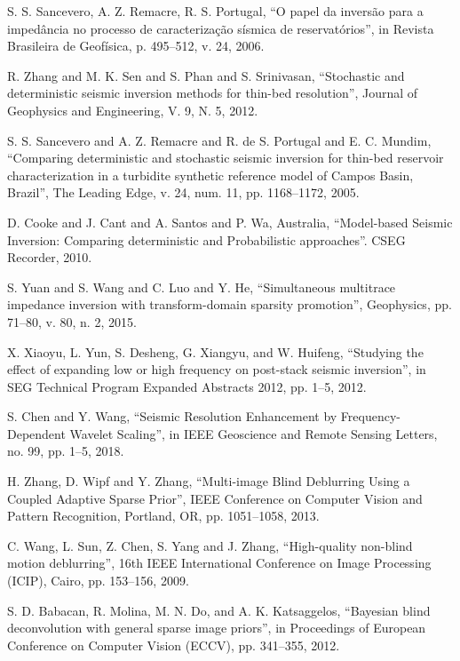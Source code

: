 \documentclass[journal]{IEEEtran}
\begin{document}
\begin{thebibliography}{1}
S. S. Sancevero, A. Z. Remacre, R. S. Portugal, ``O papel da inversão para a impedância no processo de caracterização sísmica de reservatórios'', in Revista Brasileira de Geofísica, p. 495--512, v. 24, 2006.

R. Zhang and M. K. Sen and S. Phan and S. Srinivasan, ``Stochastic and deterministic seismic inversion methods for thin-bed resolution'', Journal of Geophysics and Engineering, V. 9, N. 5, 2012.

S. S. Sancevero and A. Z. Remacre and R. de S. Portugal and E. C. Mundim, ``Comparing deterministic and stochastic seismic inversion for thin-bed reservoir characterization in a turbidite synthetic reference model of Campos Basin, Brazil'', The Leading Edge, v. 24, num. 11, pp. 1168--1172, 2005. 

D. Cooke and J. Cant and A. Santos and  P. Wa, Australia,  ``Model-based Seismic Inversion: Comparing deterministic and Probabilistic approaches''. CSEG Recorder, 2010. 

S. Yuan and S. Wang and C. Luo and Y. He, ``Simultaneous multitrace impedance inversion with transform-domain sparsity promotion'', Geophysics, pp. 71--80, v. 80, n. 2, 2015.

X. Xiaoyu, L. Yun, S. Desheng, G. Xiangyu, and W. Huifeng, ``Studying the effect of expanding low or high frequency on post-stack seismic inversion'', in SEG Technical Program Expanded Abstracts 2012, pp. 1--5, 2012.

S. Chen and Y. Wang, ``Seismic Resolution Enhancement by Frequency-Dependent Wavelet Scaling'', in IEEE Geoscience and Remote Sensing Letters, no. 99, pp. 1--5, 2018.

H. Zhang, D. Wipf and Y. Zhang, ``Multi-image Blind Deblurring Using a Coupled Adaptive Sparse Prior'', IEEE Conference on Computer Vision and Pattern Recognition, Portland, OR, pp. 1051--1058, 2013.

C. Wang, L. Sun, Z. Chen, S. Yang and J. Zhang, ``High-quality non-blind motion deblurring'', 16th IEEE International Conference on Image Processing (ICIP), Cairo, pp. 153--156, 2009.

S. D. Babacan, R. Molina, M. N. Do, and A. K. Katsaggelos, ``Bayesian blind deconvolution with general sparse image priors'', in Proceedings of European Conference on Computer Vision (ECCV), pp. 341--355, 2012.


\end{thebibliography}
\end{document}
